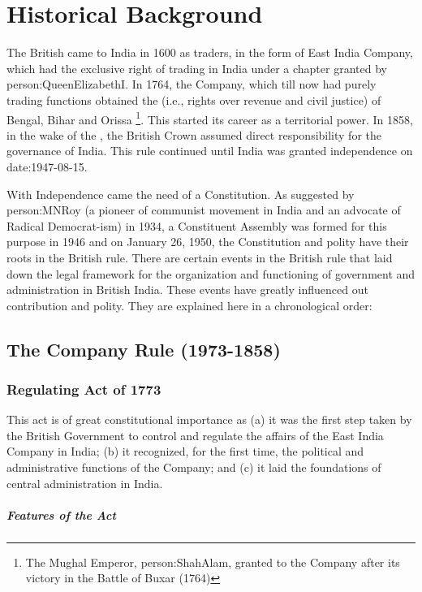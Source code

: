 \chapter{Historical Background}

The British came to India in 1600 as traders, in the form of East India Company, which had the exclusive right of trading in India under a chapter granted by \gls{person:QueenElizabethI}. In 1764, the Company, which till now had purely trading functions obtained the \hspace{4pt}(i.e., rights over revenue and civil justice) of Bengal, Bihar and Orissa
\footnote{The Mughal Emperor, \gls{person:ShahAlam}, granted  to the Company after its victory in the Battle of Buxar (1764)}. This started its career as a territorial power. In 1858, in the wake of the , the British Crown assumed direct responsibility for the governance of India. This rule continued until India was granted independence on \gls{date:1947-08-15}.

With Independence came the need of a Constitution. As suggested by \gls{person:MNRoy} (a pioneer of communist movement in India and an advocate of Radical Democrat-ism) in 1934, a Constituent Assembly was formed for this purpose in 1946 and on January 26, 1950, the Constitution and polity have their roots in the British rule. There are certain events in the British rule that laid down the legal framework for the organization and functioning of government and administration in British India. These events have greatly influenced out contribution and polity. They are explained here in a chronological order:

\section{The Company Rule (1973-1858)}

\subsection{Regulating Act of 1773}
This act is of great constitutional importance as (a) it was the first step taken by the British Government to control and regulate the affairs of the East India Company in India; (b) it recognized, for the first time, the political and administrative functions of the Company; and (c) it laid the foundations of central administration in India.

\paragraph{Features of the Act}

